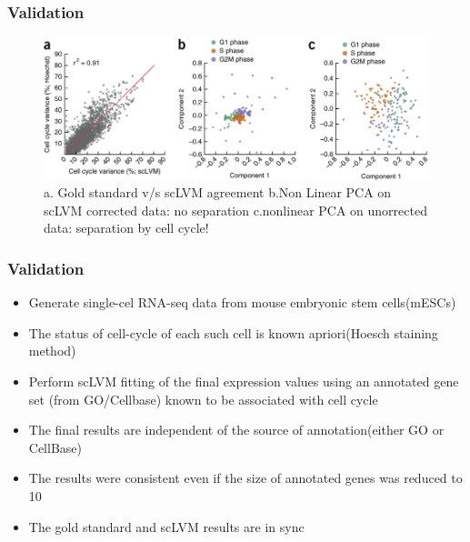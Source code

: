 \documentclass[10pt, compress]{beamer}
\renewcommand{\(}{\begin{columns}}
\renewcommand{\)}{\end{columns}}
\newcommand{\<}[1]{\begin{column}{#1}}
\renewcommand{\>}{\end{column}}
\begin{document}
\begin{frame}
\frametitle{Validation}
\begin{figure}
\includegraphics[width=0.8\linewidth]{images/results1.jpg}
\caption{a. Gold standard v/s scLVM agreement
b.Non Linear PCA on scLVM corrected data: no separation c.nonlinear PCA on unorrected data: separation by cell cycle!}
\end{figure}
\end{frame}


\begin{frame}
\frametitle{Validation}
\begin{itemize}[<+- | alert@+>]
\item Generate single-cel RNA-seq data from mouse embryonic stem cells(mESCs)
\item The status of cell-cycle of each such cell is known apriori(Hoesch staining method)
\item Perform scLVM fitting of the final expression values using an annotated gene set (from GO/Cellbase) known to be associated
with cell cycle
\item The final results are independent of the source of annotation(either GO or CellBase)
\item The results were consistent even if the size of annotated genes was reduced to 10
\item The gold standard and scLVM results are in sync
\end{itemize}
\end{frame}
\end{document}
